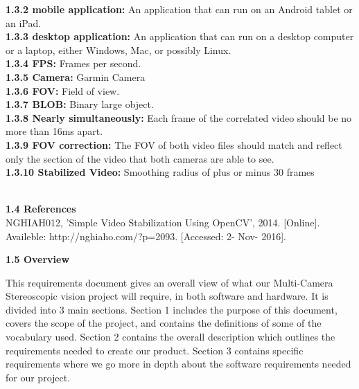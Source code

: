 \documentclass[10pt,draftclsnofoot,onecolumn]{IEEEtran}
\begin{document}
\textbf{1.3.2 mobile application:}   An application that can run on an Android tablet or an iPad.\\
 \vspace{5mm}
\textbf{1.3.3 desktop application:}   An application that can run on a desktop computer or a laptop, either Windows, Mac, or possibly Linux.
 \vspace{5mm}\\
\textbf{1.3.4 FPS:}   Frames per second.
 \vspace{5mm}\\
 \textbf{1.3.5 Camera:}   Garmin Camera
 \vspace{5mm}\\
 \textbf{1.3.6 FOV:}   Field of view.
 \vspace{5mm}\\
 \textbf{1.3.7 BLOB:}   Binary large object.
 \vspace{5mm}\\
 \textbf{1.3.8 Nearly simultaneously:}   Each frame of the correlated video should be no more than 16ms apart.
 \vspace{5mm}\\
 \textbf{1.3.9 FOV correction:}   The FOV of both video files should match and reflect only the section of the video that both cameras are able to see.
 \vspace{5mm}\\
 \textbf{1.3.10 Stabilized Video:}   Smoothing radius of plus or minus 30 frames

\\
\vspace{5mm}
{\Medium\textbf{1.4 References}}\\
\vspace{5mm}
NGHIAH012, 'Simple Video Stabilization Using OpenCV', 2014. [Online]. Availeble: http://nghiaho.com/?p=2093. [Accessed: 2- Nov- 2016].
\vspace{5mm}

{\Medium\textbf{1.5 Overview}}\\
\vspace{5mm}

This requirements document gives an overall view of what our Multi-Camera Stereoscopic vision project will require, in both software and hardware. It is divided into 3 main sections. Section 1 includes the purpose of this document, covers the scope of the project, and contains the definitions of some of the vocabulary used. Section 2 contains the overall description which outlines the requirements needed to create our product. Section 3 contains specific requirements where we go more in depth about the software requirements needed for our project.
\\
\vspace{5mm}
\end{document}
